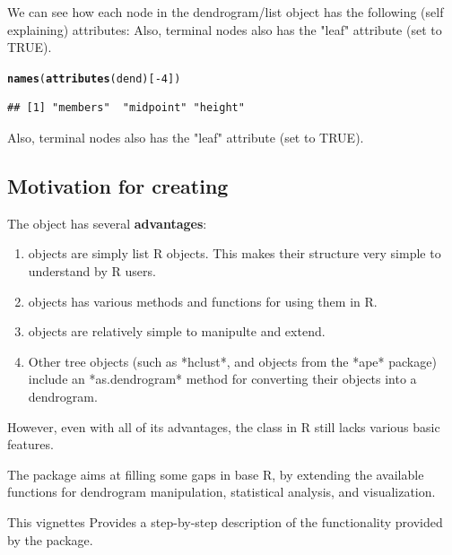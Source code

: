 \documentclass[shortnames,nojss,article]{jss}\usepackage{graphicx, color}
\makeatletter
\newcommand{\hlfunctioncall}[1]{\textcolor[rgb]{0.501960784313725,0,0.329411764705882}{\textbf{#1}}}%
\newenvironment{kframe}{%
 \def\at@end@of@kframe{}%
 \ifinner\ifhmode%
  \def\at@end@of@kframe{\end{minipage}}%
  \begin{minipage}{\columnwidth}%
 \fi\fi%
 \def\FrameCommand##1{\hskip\@totalleftmargin \hskip-\fboxsep
 \colorbox{shadecolor}{##1}\hskip-\fboxsep
     \hskip-\linewidth \hskip-\@totalleftmargin \hskip\columnwidth}%
 \MakeFramed {\advance\hsize-\width
   \@totalleftmargin\z@ \linewidth\hsize
   \@setminipage}}%
 {\par\unskip\endMakeFramed%
 \at@end@of@kframe}
\newenvironment{knitrout}{}{} %
\makeatother
\begin{document}
We can see how each node in the dendrogram/list object has the following (self explaining) attributes:
Also, terminal nodes also has the "leaf" attribute (set to TRUE).
\begin{knitrout}
\color{fgcolor}\begin{kframe}
\begin{alltt}
\hlfunctioncall{names}(\hlfunctioncall{attributes}(dend)[-4])
\end{alltt}
\begin{verbatim}
## [1] "members"  "midpoint" "height"
\end{verbatim}
\end{kframe}
\end{knitrout}

Also, terminal nodes also has the "leaf" attribute (set to TRUE).

\subsection{Motivation for creating }



The  object has several \textbf{advantages}:

\begin{enumerate}
   \item {} objects are simply list R objects. This makes their structure  very simple to understand by R users.
   \item {} objects has various methods and functions for using them in R. 
   \item {} objects are relatively simple to manipulte and extend.
   \item Other tree objects (such as *hclust*, and objects from the *{ape}* package) include an *as.dendrogram* method for converting their objects into a dendrogram.
\end{enumerate}


However, even with all of its advantages, the  class in R still lacks various basic features.

The  package aims at filling some gaps in base R, by extending the available functions for dendrogram manipulation, statistical analysis, and visualization.

This vignettes Provides a step-by-step description of the functionality provided by the  package.
\end{document}
